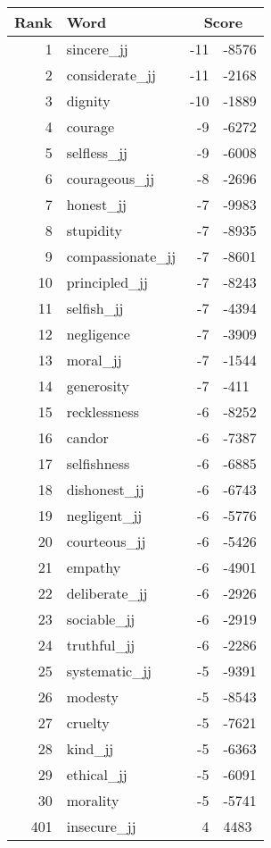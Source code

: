 \begin{longtable}[!htbp]{| rlr@{.}l |}
    \hline
    \textbf{Rank} & \textbf{Word} & \multicolumn{2}{c|}{\textbf{Score}} \\
    \hline
    \endhead
    1 & sincere\_jj & -11 & -8576 \\
    2 & considerate\_jj & -11 & -2168 \\
    3 & dignity & -10 & -1889 \\
    4 & courage & -9 & -6272 \\
    5 & selfless\_jj & -9 & -6008 \\
    6 & courageous\_jj & -8 & -2696 \\
    7 & honest\_jj & -7 & -9983 \\
    8 & stupidity & -7 & -8935 \\
    9 & compassionate\_jj & -7 & -8601 \\
    10 & principled\_jj & -7 & -8243 \\
    11 & selfish\_jj & -7 & -4394 \\
    12 & negligence & -7 & -3909 \\
    13 & moral\_jj & -7 & -1544 \\
    14 & generosity & -7 & -411 \\
    15 & recklessness & -6 & -8252 \\
    16 & candor & -6 & -7387 \\
    17 & selfishness & -6 & -6885 \\
    18 & dishonest\_jj & -6 & -6743 \\
    19 & negligent\_jj & -6 & -5776 \\
    20 & courteous\_jj & -6 & -5426 \\
    21 & empathy & -6 & -4901 \\
    22 & deliberate\_jj & -6 & -2926 \\
    23 & sociable\_jj & -6 & -2919 \\
    24 & truthful\_jj & -6 & -2286 \\
    25 & systematic\_jj & -5 & -9391 \\
    26 & modesty & -5 & -8543 \\
    27 & cruelty & -5 & -7621 \\
    28 & kind\_jj & -5 & -6363 \\
    29 & ethical\_jj & -5 & -6091 \\
    30 & morality & -5 & -5741 \\
    401 & insecure\_jj & 4 & 4483 \\

\end{longtable}

